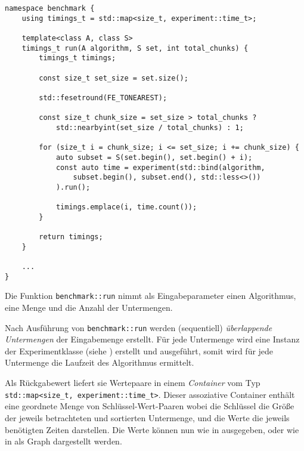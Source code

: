\begin{lstlisting}[label=lst:benchmark, caption={Implementation einer Funktion zur Ermittlung der praktischen Effizienz eines Algorithmus mit einer bestimmenten Eingabemenge.}]
namespace benchmark {
	using timings_t = std::map<size_t, experiment::time_t>;

	template<class A, class S>
	timings_t run(A algorithm, S set, int total_chunks) {
		timings_t timings;

		const size_t set_size = set.size();

		std::fesetround(FE_TONEAREST);

		const size_t chunk_size = set_size > total_chunks ?
			std::nearbyint(set_size / total_chunks) : 1;

		for (size_t i = chunk_size; i <= set_size; i += chunk_size) {
			auto subset = S(set.begin(), set.begin() + i);
			const auto time = experiment(std::bind(algorithm,
				subset.begin(), subset.end(), std::less<>())
			).run();

			timings.emplace(i, time.count());
		}

		return timings;
	}
	
	...
}
\end{lstlisting}

Die Funktion \lstinline{benchmark::run} nimmt als Eingabeparameter einen Algorithmus, eine Menge und die Anzahl der Untermengen.

Nach Ausführung von \lstinline{benchmark::run} werden (sequentiell) \emph{überlappende Untermengen} der Eingabemenge erstellt. Für jede Untermenge wird eine Instanz der Experimentklasse (siehe ) erstellt und ausgeführt, somit wird für jede Untermenge die Laufzeit des Algorithmus ermittelt.

Als Rückgabewert liefert sie Wertepaare in einem \emph{Container} vom Typ \lstinline{std::map<size_t, experiment::time_t>}. Dieser assoziative Container enthält eine geordnete Menge von Schlüssel-Wert-Paaren wobei die Schlüssel die Größe der jeweils betrachteten und sortierten Untermenge, und die Werte die jeweils benötigten Zeiten darstellen. Die Werte können nun wie in  ausgegeben, oder wie in  als Graph dargestellt werden.



